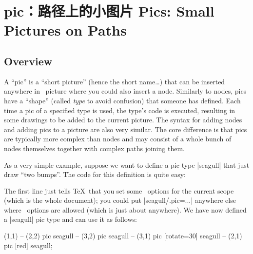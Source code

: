%
%
%


\section{pic：路径上的小图片 Pics: Small Pictures on Paths}
\label{section-pics}

\subsection{Overview}

A ``pic'' is a ``short picture'' (hence the short name\dots) that can be
inserted anywhere in \tikzname\ picture where you could also insert a node.
Similarly to nodes, pics have a ``shape'' (called \emph{type} to avoid
confusion) that someone has defined. Each time a pic of a specified type is
used, the type's code is executed, resulting in some drawings to be added to
the current picture. The syntax for adding nodes and adding pics to a picture
are also very similar. The core difference is that pics are typically more
complex than nodes and may consist of a whole bunch of nodes themselves
together with complex paths joining them.

As a very simple example, suppose we want to define a pic type |seagull| that
just draw ``two bumps''. The code for this definition is quite easy:
%
\begin{codeexample}
\end{codeexample}

The first line just tells \TeX\ that you set some \tikzname\ options for the
current scope (which is the whole document); you could put |seagull/.pic=...|
anywhere else where \tikzname\ options are allowed (which is just about
anywhere). We have now defined a |seagull| pic type and can use it as follows:
%
\begin{codeexample}[
    pre={\tikzset{
  seagull/.pic={
    \draw (-3mm,0) to [bend left] (0,0) to [bend left] (3mm,0);
  },
}}]
\tikz \fill [fill=blue!20]
     (1,1)
  -- (2,2) pic             {seagull}
  -- (3,2) pic             {seagull}
  -- (3,1) pic [rotate=30] {seagull}
  -- (2,1) pic [red]       {seagull};
\end{codeexample}

